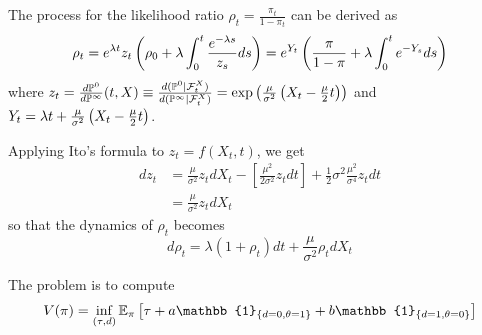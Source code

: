 \begin{remark}
    The process for the likelihood ratio $\rho_t = \frac{\pi_t}{1-\pi_t}$ can be derived as
    \[ \rho_t = e^{\lambda t} z_t \left( \rho_0 + \lambda \int_0^t \frac{e^{-\lambda s}}{z_s} ds \right) = e^{Y_t} \left( \frac{\pi}{1-\pi} + \lambda \int_0^t e^{-Y_s} ds \right) \]
    where $z_t = \frac{d\mathbb P^0}{d\mathbb P^\infty}(t, X) \equiv \frac{d(\mathbb P^0 \mid \mathcal{F}_t^X)}{d(\mathbb P^\infty \mid \mathcal{F}_t^X)} = \exp \left( \frac{\mu}{\sigma^2} \left( X_t - \frac{\mu}{2} t \right) \right)$ and $Y_t = \lambda t + \frac{\mu}{\sigma^2} \left( X_t - \frac{\mu}{2} t \right)$.
    
    Applying Ito's formula to $z_t = f(X_t, t)$, we get
    \begin{align*}
        dz_t &= \frac{\mu}{\sigma^2} z_t dX_t - \left[ \frac{\mu^2}{2\sigma^2} z_t dt \right] + \frac{1}{2} \sigma^2 \frac{\mu^2}{\sigma^4} z_t dt \\
        &= \frac{\mu}{\sigma^2} z_t dX_t
    \end{align*}
    so that the dynamics of $\rho_t$ becomes
    \[ d\rho_t = \lambda(1 + \rho_t) dt + \frac{\mu}{\sigma^2} \rho_t dX_t \]
\end{remark}

\begin{remark}
    The problem is to compute
    \[ V(\pi) = \inf_{(\tau, d)} \EE_\pi \left[ \tau + a \mathbb{1}_{\{d=0, \theta=1\}} + b \mathbb{1}_{\{d=1, \theta=0\}} \right] \]
\end{remark}